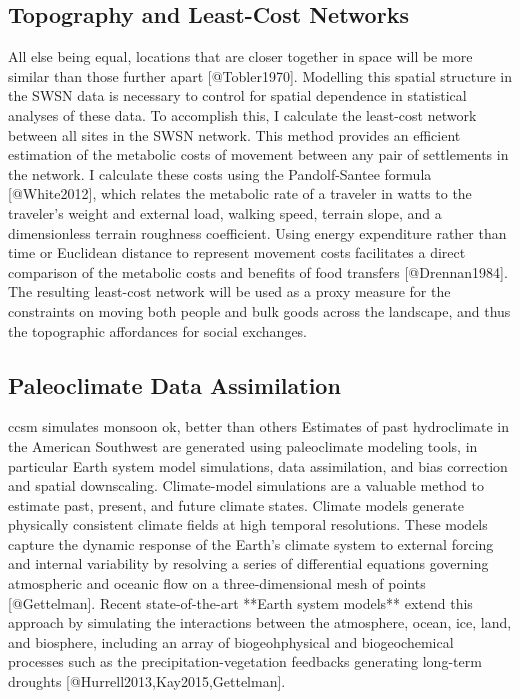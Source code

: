 \documentclass[fleqn,10pt]{wlscirep}
\begin{document}
\subsection*{Topography and Least-Cost Networks}
All else being equal, locations that are closer together in space will be more similar than those further apart [@Tobler1970]. Modelling this spatial structure in the SWSN data is necessary to control for spatial dependence in statistical analyses of these data. To accomplish this, I calculate the least-cost network between all sites in the SWSN network. This method provides an efficient estimation of the metabolic costs of movement between any pair of settlements in the network. I calculate these costs using the Pandolf-Santee formula [@White2012], which relates the metabolic rate of a traveler in watts to the traveler's weight and external load, walking speed, terrain slope, and a dimensionless terrain roughness coefficient. Using energy expenditure rather than time or Euclidean distance to represent movement costs facilitates a direct comparison of the metabolic costs and benefits of food transfers  [@Drennan1984]. The resulting least-cost network will be used as a proxy measure for the constraints on moving both people and bulk goods across the landscape, and thus the topographic affordances for social exchanges.

\subsection*{Paleoclimate Data Assimilation}
ccsm simulates monsoon ok, better than others
Estimates of past hydroclimate in the American Southwest are generated using paleoclimate modeling tools, in particular Earth system model simulations, data assimilation, and bias correction and spatial downscaling. Climate-model simulations are a valuable method to estimate past, present, and future climate states. Climate models generate physically consistent climate fields at high temporal resolutions. These models capture the dynamic response of the Earth’s climate system to external forcing and internal variability by resolving a series of differential equations governing atmospheric and oceanic flow on a three-dimensional mesh of points [@Gettelman]. Recent state-of-the-art **Earth system models** extend this approach by simulating the interactions between the atmosphere, ocean, ice, land, and biosphere, including an array of biogeohphysical and biogeochemical processes such as the precipitation-vegetation feedbacks generating long-term droughts [@Hurrell2013,Kay2015,Gettelman].
\end{document}
